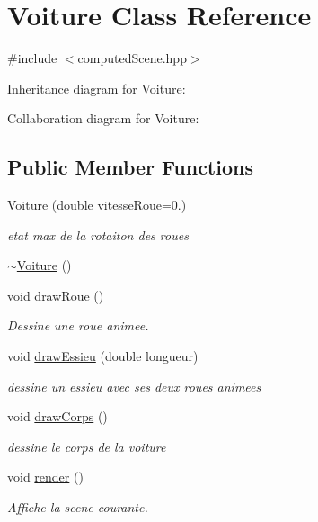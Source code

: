 \hypertarget{class_voiture}{}\section{Voiture Class Reference}
\label{class_voiture}


{\ttfamily \#include $<$computed\+Scene.\+hpp$>$}



Inheritance diagram for Voiture\+:


Collaboration diagram for Voiture\+:
\subsection*{Public Member Functions}
\begin{DoxyCompactItemize}
\item 
\hyperlink{class_voiture_a566a3faabc5c390003fa46988e5928a1}{Voiture} (double vitesse\+Roue=0.)
\begin{DoxyCompactList}\small\item\em etat max de la rotaiton des roues \end{DoxyCompactList}\item 
\hyperlink{class_voiture_afe85820a993b6908d0fdb524245e5133}{$\sim$\+Voiture} ()
\item 
void \hyperlink{class_voiture_a6232a9043c077a4f69e92b90566d9b78}{draw\+Roue} ()
\begin{DoxyCompactList}\small\item\em Dessine une roue animee. \end{DoxyCompactList}\item 
void \hyperlink{class_voiture_ab94ee125473d3b3d2b017e83e8be6f3f}{draw\+Essieu} (double longueur)
\begin{DoxyCompactList}\small\item\em dessine un essieu avec ses deux roues animees \end{DoxyCompactList}\item 
void \hyperlink{class_voiture_a7fa87c8502621808711285bf09c4b82e}{draw\+Corps} ()
\begin{DoxyCompactList}\small\item\em dessine le corps de la voiture \end{DoxyCompactList}\item 
void \hyperlink{class_voiture_a4abe5b41fc48c9cbdd0da7780dcd9a53}{render} ()
\begin{DoxyCompactList}\small\item\em Affiche la scene courante. \end{DoxyCompactList}\end{DoxyCompactItemize}


